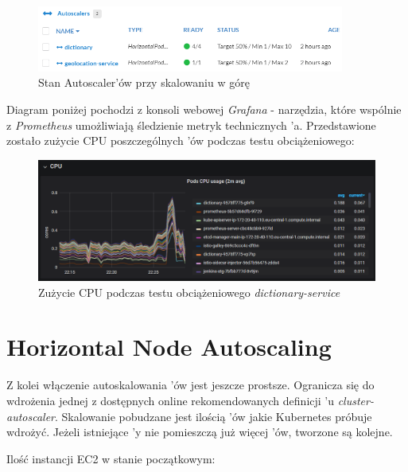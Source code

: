 \begin{figure}[!ht]
	\begin{center}
		\includegraphics[width=0.9\textwidth]{img/autoscaling/hpa-autoscalers-scale-up}
	\end{center}
    \caption{Stan Autoscaler'ów przy skalowaniu w górę}
\end{figure}

Diagram poniżej pochodzi z konsoli webowej \emph{Grafana} - narzędzia, które wspólnie z \emph{Prometheus} umożliwiają śledzienie metryk technicznych 'a.
Przedstawione zostało zużycie CPU poszczególnych 'ów podczas testu obciążeniowego:

\begin{figure}[!ht]
	\begin{center}
		\includegraphics[width=1\textwidth]{img/autoscaling/hpa-grafana-scale-up}
	\end{center}
    \caption{Zużycie CPU podczas testu obciążeniowego \emph{dictionary-service}}
\end{figure}

\section{Horizontal Node Autoscaling}

Z kolei włączenie autoskalowania 'ów jest jeszcze prostsze. 
Ogranicza się do wdrożenia jednej z dostępnych online rekomendowanych definicji 'u \emph{cluster-autoscaler}.
Skalowanie pobudzane jest ilością 'ów jakie Kubernetes próbuje wdrożyć.
Jeżeli istniejące 'y nie pomieszczą już więcej 'ów, tworzone są kolejne.


Ilość instancji EC2 w stanie początkowym:

